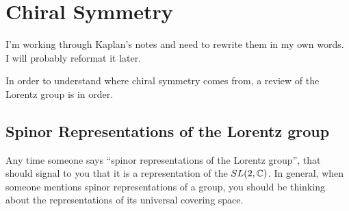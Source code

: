 \documentclass[main.tex]{subfiles}
\begin{document}
\chapter{Chiral Symmetry}
I'm working through Kaplan's notes and need to rewrite them in my own words. I will probably reformat it later.

In order to understand where chiral symmetry comes from, a review of the Lorentz group is in order.

\section{Spinor Representations of the Lorentz group}
Any time someone says ``spinor representations of the Lorentz group'', that should signal to you that it is a representation of the $SL(2,\mathbb{C})$. In general, when someone mentions spinor representations of a group, you should be thinking about the representations of its universal covering space.
\end{document}
